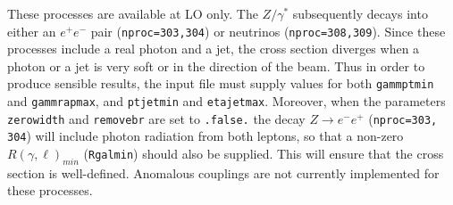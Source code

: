
These processes are available at LO only. The $Z/\gamma^*$ subsequently decays into
either an $e^+ e^-$ pair ({\tt nproc=303,304}) or neutrinos ({\tt nproc=308,309}).
Since these processes include a real photon and a jet, the cross section diverges
when a photon or a jet is very soft or in the direction of the beam.
Thus in order to produce sensible results, the input file must supply values for both
{\tt gammptmin} and {\tt gammrapmax}, and {\tt ptjetmin} and {\tt etajetmax}.
 Moreover, when the parameters {\tt zerowidth}
and {\tt removebr} are set to {\tt .false.} the decay $Z \to e^- e^+$ ({\tt nproc=303, 304})
will include photon radiation from both leptons, so that a non-zero $R(\gamma,\ell)_{min}$
({\tt Rgalmin})
should also be supplied. This will ensure that the cross section is well-defined.
Anomalous couplings are not currently implemented for these processes.

